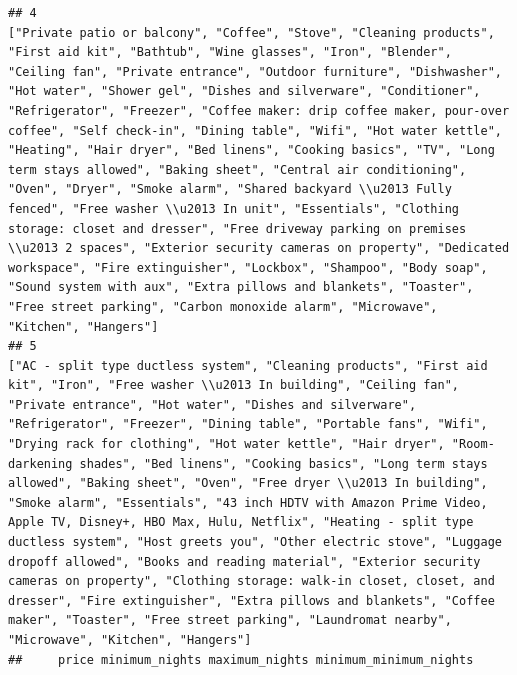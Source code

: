 \documentclass[
]{article}
\begin{document}
\begin{verbatim}
## 4                                                                                                                                                                ["Private patio or balcony", "Coffee", "Stove", "Cleaning products", "First aid kit", "Bathtub", "Wine glasses", "Iron", "Blender", "Ceiling fan", "Private entrance", "Outdoor furniture", "Dishwasher", "Hot water", "Shower gel", "Dishes and silverware", "Conditioner", "Refrigerator", "Freezer", "Coffee maker: drip coffee maker, pour-over coffee", "Self check-in", "Dining table", "Wifi", "Hot water kettle", "Heating", "Hair dryer", "Bed linens", "Cooking basics", "TV", "Long term stays allowed", "Baking sheet", "Central air conditioning", "Oven", "Dryer", "Smoke alarm", "Shared backyard \\u2013 Fully fenced", "Free washer \\u2013 In unit", "Essentials", "Clothing storage: closet and dresser", "Free driveway parking on premises \\u2013 2 spaces", "Exterior security cameras on property", "Dedicated workspace", "Fire extinguisher", "Lockbox", "Shampoo", "Body soap", "Sound system with aux", "Extra pillows and blankets", "Toaster", "Free street parking", "Carbon monoxide alarm", "Microwave", "Kitchen", "Hangers"]
## 5                                                                                                                                                                                                                       ["AC - split type ductless system", "Cleaning products", "First aid kit", "Iron", "Free washer \\u2013 In building", "Ceiling fan", "Private entrance", "Hot water", "Dishes and silverware", "Refrigerator", "Freezer", "Dining table", "Portable fans", "Wifi", "Drying rack for clothing", "Hot water kettle", "Hair dryer", "Room-darkening shades", "Bed linens", "Cooking basics", "Long term stays allowed", "Baking sheet", "Oven", "Free dryer \\u2013 In building", "Smoke alarm", "Essentials", "43 inch HDTV with Amazon Prime Video, Apple TV, Disney+, HBO Max, Hulu, Netflix", "Heating - split type ductless system", "Host greets you", "Other electric stove", "Luggage dropoff allowed", "Books and reading material", "Exterior security cameras on property", "Clothing storage: walk-in closet, closet, and dresser", "Fire extinguisher", "Extra pillows and blankets", "Coffee maker", "Toaster", "Free street parking", "Laundromat nearby", "Microwave", "Kitchen", "Hangers"]
##     price minimum_nights maximum_nights minimum_minimum_nights

\end{verbatim}
\end{document}
